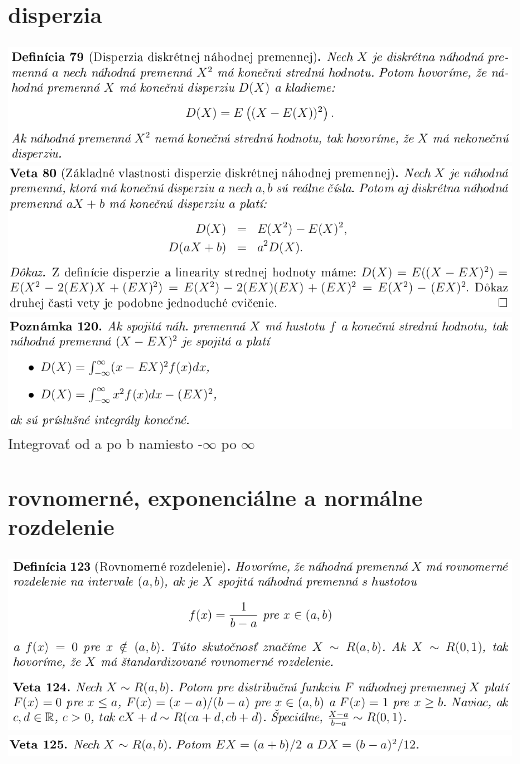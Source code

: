 \subsection {disperzia}
\includegraphics[width=1\textwidth]{images/pravdepodobnost/disp}\\
\includegraphics[width=1\textwidth]{images/pravdepodobnost/vlast_disp}\\
\includegraphics[width=1\textwidth]{images/pravdepodobnost/pozn_disp_spoj}\\
Integrovať od a po b namiesto -$\infty$ po $\infty$\\
\subsection {rovnomerné, exponenciálne a normálne rozdelenie}
\includegraphics[width=1\textwidth]{images/pravdepodobnost/rovn_rozd}\\
\includegraphics[width=1\textwidth]{images/pravdepodobnost/rovn_rozd_II}

